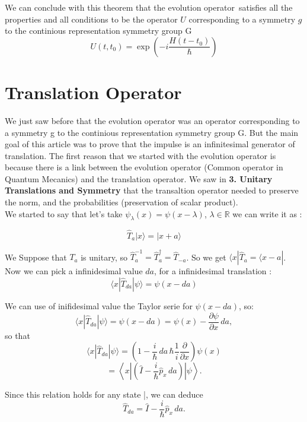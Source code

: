 \documentclass{article}
\begin{document}
We can conclude with this theorem that the evolution operator\
satisfies all the properties and all conditions to be the operator $U$ corresponding to a symmetry $g$ to the continious representation symmetry group G
$$
 U(t,t_0) = \exp\!\left( -i \frac{H (t - t_0)}{\hbar}\right)
$$



\section{\textbf{Translation Operator}}

We just saw before that the evolution operator was an operator corresponding to a symmetry g to the continious representation symmetry group G. But the main goal of this article was to prove that the impulse is an infinitesimal generator of translation. The first reason that we started with the evolution operator is because there is a link between the evolution operator (Common operator in Quantum Mecanics) and the translation operator.
We saw in \textbf{3. Unitary Translations and Symmetry} that the transaltion operator needed to preserve the norm, and the probabilities (preservation of scalar product).\\

We started to say that let's take $\psi_{\lambda}(x) = \psi(x - \lambda) $, $\lambda \in \mathbb{R}$
we can write it as :

$$
\hat{T}_a | x \rangle = | x + a \rangle
$$

We Suppose that $T_a$ is unitary, so $\hat{T}^{-1}_a = \hat{T}^{\dagger}_a = \hat{T}_{-a}$.
So we get $ \langle x |\hat{T}_a  = \langle  x - a |$.\\

Now we can pick a infinidesimal value $da$, for a infinidesimal translation :
$$
\langle x |\hat{T}_{da} |\psi \rangle = \psi(x-da)
$$
 
 We can use of inifidesimal value the Taylor serie for $\psi(x-da)$, so:
$$
\langle x | \hat{T}_{da} | \psi \rangle
= \psi(x - da)
= \psi(x) - \frac{\partial \psi}{\partial x} \, da,
$$
so that
$$
	\langle x | \hat{T}_{da} | \psi \rangle
	=
	\left(
	1 - \frac{i}{\hbar} \, da \, \hbar \frac{1}{i} \frac{\partial}{\partial x}
	\right) \psi(x)
$$
$$
	=
	\left\langle x \left|
	\left(
	\hat{I} - \frac{i}{\hbar} \hat{p}_x \, da
	\right)
	\right| \psi \right\rangle.
$$

Since this relation holds for any state |\psi\rangle, we can deduce
$$
\hat{T}_{da}
=
\hat{I}
-
\frac{i}{\hbar} \hat{p}_x \, da.
$$
\end{document}
